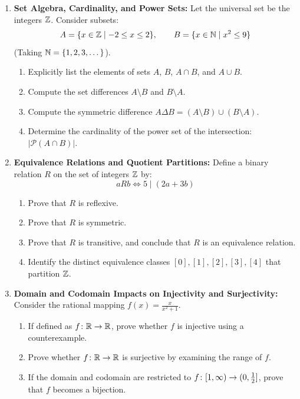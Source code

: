\begin{enumerate}
    \item \textbf{Set Algebra, Cardinality, and Power Sets:} Let the universal set be the integers $\mathbb{Z}$. Consider subsets:
    $$A = \{x \in \mathbb{Z} \mid -2 \le x \le 2\}, \qquad B = \{x \in \mathbb{N} \mid x^2 \le 9\}$$
    (Taking $\mathbb{N} = \{1, 2, 3, \dots\}$).
    \begin{enumerate}
        \item Explicitly list the elements of sets $A$, $B$, $A \cap B$, and $A \cup B$.
        \item Compute the set differences $A \setminus B$ and $B \setminus A$.
        \item Compute the symmetric difference $A \Delta B = (A \setminus B) \cup (B \setminus A)$.
        \item Determine the cardinality of the power set of the intersection: $|\mathcal{P}(A \cap B)|$.
    \end{enumerate}

    \item \textbf{Equivalence Relations and Quotient Partitions:} Define a binary relation $R$ on the set of integers $\mathbb{Z}$ by:
    $$a R b \iff 5 \mid (2a + 3b)$$
    \begin{enumerate}
        \item Prove that $R$ is reflexive.
        \item Prove that $R$ is symmetric.
        \item Prove that $R$ is transitive, and conclude that $R$ is an equivalence relation.
        \item Identify the distinct equivalence classes $[0], [1], [2], [3], [4]$ that partition $\mathbb{Z}$.
    \end{enumerate}

    \item \textbf{Domain and Codomain Impacts on Injectivity and Surjectivity:} Consider the rational mapping $f(x) = \frac{x}{x^2 + 1}$.
    \begin{enumerate}
        \item If defined as $f \colon \mathbb{R} \to \mathbb{R}$, prove whether $f$ is injective using a counterexample.
        \item Prove whether $f \colon \mathbb{R} \to \mathbb{R}$ is surjective by examining the range of $f$.
        \item If the domain and codomain are restricted to $f \colon [1, \infty) \to (0, \frac{1}{2}]$, prove that $f$ becomes a bijection.
    \end{enumerate}


\end{enumerate}
